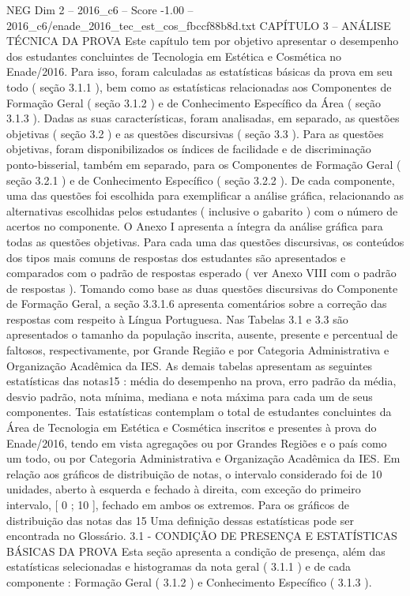 \begin{textsample}{NEG Dim 2 – 2016\_c6 – Score -1.00 – 2016\_c6/enade\_2016\_tec\_est\_cos\_fbccf88b8d.txt}  \label{ex:f2_neg_223}
CAPÍTULO 3 – ANÁLISE TÉCNICA DA PROVA Este capítulo tem por objetivo apresentar o desempenho dos estudantes concluintes de Tecnologia em Estética e Cosmética no Enade/2016.
Para isso, foram calculadas as estatísticas básicas da prova em seu todo ( seção 3.1.1 ), bem como as estatísticas relacionadas aos Componentes de Formação Geral ( seção 3.1.2 ) e de Conhecimento Específico da Área ( seção 3.1.3 ).
Dadas as suas características, foram analisadas, em separado, as questões objetivas ( seção 3.2 ) e as questões discursivas ( seção 3.3 ).
Para as questões objetivas, foram disponibilizados os índices de facilidade e de discriminação ponto-bisserial, também em separado, para os Componentes de Formação Geral ( seção 3.2.1 ) e de Conhecimento Específico ( seção 3.2.2 ).
De cada componente, uma das questões foi escolhida para exemplificar a análise gráfica, relacionando as alternativas escolhidas pelos estudantes ( inclusive o gabarito ) com o número de acertos no componente.
O Anexo I apresenta a íntegra da análise gráfica para todas as questões objetivas.
Para cada uma das questões discursivas, os conteúdos dos tipos mais comuns de respostas dos estudantes são apresentados e comparados com o padrão de respostas esperado ( ver Anexo VIII com o padrão de respostas ).
Tomando como base as duas questões discursivas do Componente de Formação Geral, a seção 3.3.1.6 apresenta comentários sobre a correção das respostas com respeito à Língua Portuguesa.
Nas Tabelas 3.1 e 3.3 são apresentados o tamanho da população inscrita, ausente, presente e percentual de faltosos, respectivamente, por Grande Região e por Categoria Administrativa e Organização Acadêmica da IES.
As demais tabelas apresentam as seguintes estatísticas das notas15 : média do desempenho na prova, erro padrão da média, desvio padrão, nota mínima, mediana e nota máxima para cada um de seus componentes.
Tais estatísticas contemplam o total de estudantes concluintes da Área de Tecnologia em Estética e Cosmética inscritos e presentes à prova do Enade/2016, tendo em vista agregações ou por Grandes Regiões e o país como um todo, ou por Categoria Administrativa e Organização Acadêmica da IES.
Em relação aos gráficos de distribuição de notas, o intervalo considerado foi de 10 unidades, aberto à esquerda e fechado à direita, com exceção do primeiro intervalo, [ 0 ; 10 ], fechado em ambos os extremos.
Para os gráficos de distribuição das notas das 15 Uma definição dessas estatísticas pode ser encontrada no Glossário. 3.1 - CONDIÇÃO DE PRESENÇA E ESTATÍSTICAS BÁSICAS DA PROVA Esta seção apresenta a condição de presença, além das estatísticas selecionadas e histogramas da nota geral ( 3.1.1 ) e de cada componente : Formação Geral ( 3.1.2 ) e Conhecimento Específico ( 3.1.3 ).

\end{textsample}
